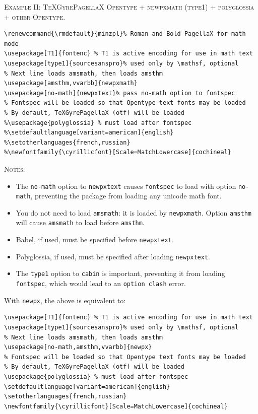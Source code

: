 \documentclass[11pt]{article}
\theoremstyle{oldplain}
\theoremstyle{plain}
\begin{document}
\textsc{Example II: TeXGyrePagellaX Opentype + newpxmath (type1) + polyglossia + other Opentype.}
\begin{verbatim}
\renewcommand{\rmdefault}{minzpl}% Roman and Bold PagellaX for math mode
\usepackage[T1]{fontenc} % T1 is active encoding for use in math text
\usepackage[type1]{sourcesanspro}% used only by \mathsf, optional
% Next line loads amsmath, then loads amsthm
\usepackage[amsthm,vvarbb]{newpxmath}
\usepackage[no-math]{newpxtext}% pass no-math option to fontspec
% Fontspec will be loaded so that Opentype text fonts may be loaded
% By default, TeXGyrePagellaX (otf) will be loaded
%\usepackage{polyglossia} % must load after fontspec
%\setdefaultlanguage[variant=american]{english}
%\setotherlanguages{french,russian}
%\newfontfamily{\cyrillicfont}[Scale=MatchLowercase]{cochineal}
\end{verbatim}
\textsc{Notes:}
\begin{itemize}
\item The {\tt no-math} option to {\tt newpxtext} causes {\tt fontspec} to load with option {\tt no-math}, preventing the package from loading any unicode math font.
\item
You do not need to load {\tt amsmath}: it is loaded by {\tt newpxmath}. Option {\tt amsthm} will cause {\tt amsmath} to load before {\tt amsthm}.
\item Babel, if used, must be specified before {\tt newpxtext}.
\item Polyglossia, if used, must be specified after loading {\tt newpxtext}.
\item The {\tt type1} option to {\tt cabin} is important, preventing it from loading {\tt fontspec}, which would lead to an {\tt option clash} error. 
\end{itemize}
With {\tt newpx}, the above is equivalent to:
\begin{verbatim}
\usepackage[T1]{fontenc} % T1 is active encoding for use in math text
\usepackage[type1]{sourcesanspro}% used only by \mathsf, optional
% Next line loads amsmath, then loads amsthm
\usepackage[no-math,amsthm,vvarbb]{newpx}
% Fontspec will be loaded so that Opentype text fonts may be loaded
% By default, TeXGyrePagellaX (otf) will be loaded
\usepackage{polyglossia} % must load after fontspec
\setdefaultlanguage[variant=american]{english}
\setotherlanguages{french,russian}
\newfontfamily{\cyrillicfont}[Scale=MatchLowercase]{cochineal}
\end{verbatim}
\end{document}
